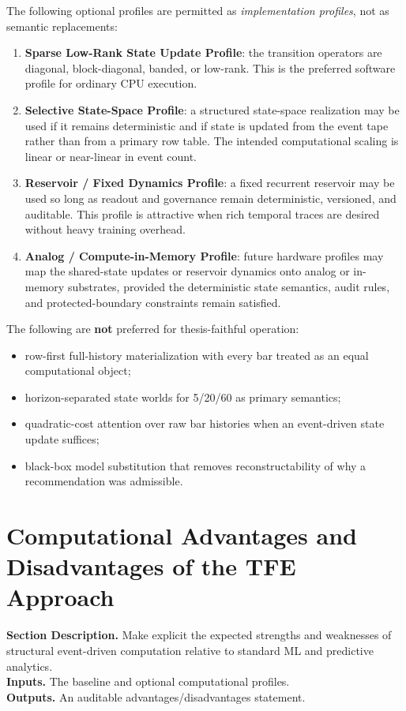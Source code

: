 \documentclass[11pt]{report}
\newcommand{\meta}[3]{\textbf{Section Description.} #1\\
\textbf{Inputs.} #2\\
\textbf{Outputs.} #3\par}
\begin{document}
The following optional profiles are permitted as \emph{implementation profiles}, not as semantic replacements:
\begin{enumerate}[leftmargin=1.2cm]
    \item \textbf{Sparse Low-Rank State Update Profile}: the transition operators are diagonal, block-diagonal, banded, or low-rank. This is the preferred software profile for ordinary CPU execution.
    \item \textbf{Selective State-Space Profile}: a structured state-space realization may be used if it remains deterministic and if state is updated from the event tape rather than from a primary row table. The intended computational scaling is linear or near-linear in event count.
    \item \textbf{Reservoir / Fixed Dynamics Profile}: a fixed recurrent reservoir may be used so long as readout and governance remain deterministic, versioned, and auditable. This profile is attractive when rich temporal traces are desired without heavy training overhead.
    \item \textbf{Analog / Compute-in-Memory Profile}: future hardware profiles may map the shared-state updates or reservoir dynamics onto analog or in-memory substrates, provided the deterministic state semantics, audit rules, and protected-boundary constraints remain satisfied.
\end{enumerate}

The following are \textbf{not} preferred for thesis-faithful operation:
\begin{itemize}
    \item row-first full-history materialization with every bar treated as an equal computational object;
    \item horizon-separated state worlds for 5/20/60 as primary semantics;
    \item quadratic-cost attention over raw bar histories when an event-driven state update suffices;
    \item black-box model substitution that removes reconstructability of why a recommendation was admissible.
\end{itemize}

\section{Computational Advantages and Disadvantages of the TFE Approach}
\meta{Make explicit the expected strengths and weaknesses of structural event-driven computation relative to standard ML and predictive analytics.}{The baseline and optional computational profiles.}{An auditable advantages/disadvantages statement.}
\end{document}
